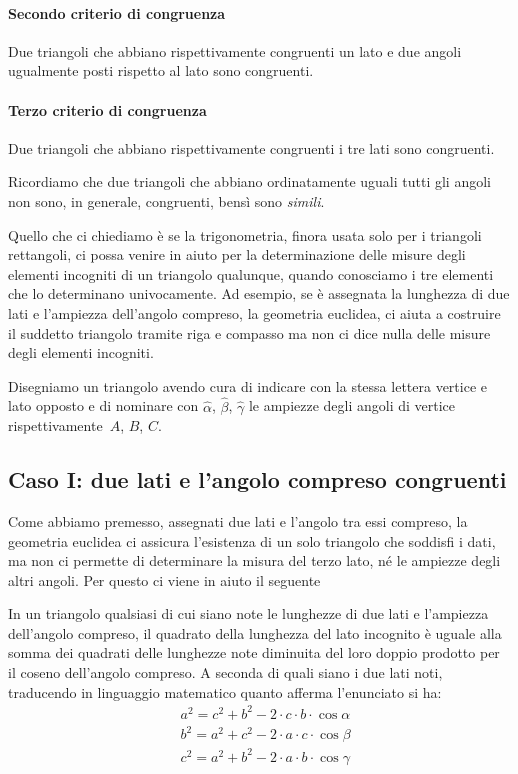 \paragraph{Secondo criterio di congruenza}
Due triangoli che abbiano rispettivamente congruenti un lato e due
angoli ugualmente posti rispetto al lato sono congruenti.

\paragraph{Terzo criterio di congruenza}
Due triangoli che abbiano rispettivamente congruenti i tre lati sono congruenti.

Ricordiamo che due triangoli che abbiano ordinatamente uguali tutti gli angoli 
non sono, in generale, congruenti, bensì sono \emph{simili}.

Quello che ci chiediamo è se la trigonometria, finora usata solo per i triangoli 
rettangoli, ci possa venire in aiuto per la
determinazione delle misure degli elementi incogniti di un triangolo qualunque, 
quando conosciamo i tre elementi che lo
determinano univocamente. Ad esempio, se è assegnata la lunghezza di due lati e 
l'ampiezza dell'angolo compreso,
la geometria euclidea, ci aiuta a costruire il suddetto triangolo tramite riga e 
compasso ma non ci dice nulla delle
misure degli elementi incogniti.

Disegniamo un triangolo avendo cura di indicare con la stessa lettera vertice e 
lato opposto e di nominare con
${\hat{\alpha}}$, ${\hat{\beta}}$, ${\hat{\gamma}}$ le ampiezze degli angoli di 
vertice rispettivamente~$A$, $B$, $C$.
\begin{center}
 
\end{center}


\subsection{Caso I: due lati e l'angolo compreso congruenti}

Come abbiamo premesso, assegnati due lati e l'angolo tra essi compreso, la 
geometria euclidea ci assicura l'esistenza
di un solo triangolo che soddisfi i dati, ma non ci permette di determinare la 
misura del terzo lato, né le ampiezze degli altri angoli.
Per questo ci viene in aiuto il seguente

\begin{teorema}
In un triangolo qualsiasi di cui siano note le lunghezze di due lati e 
l'ampiezza dell'angolo compreso, il quadrato della lunghezza
del lato incognito è uguale alla somma dei quadrati delle lunghezze note 
diminuita del loro doppio prodotto per il coseno dell'angolo compreso.
A seconda di quali siano i due lati noti, traducendo in linguaggio matematico 
quanto afferma l'enunciato si ha:
\begin{align*}
&a^{2}=c^{2}+b^{2}-2\cdot c\cdot b\cdot \cos \alpha\\
&b^{2}=a^{2}+c^{2}-2\cdot a\cdot c\cdot \cos  \beta\\
&c^{2}=a^{2}+b^{2}-2\cdot a\cdot b\cdot \cos \gamma
\end{align*}
\end{teorema}

